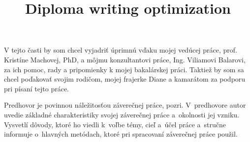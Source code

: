 \documentclass[]{tukediphc}
\title{Diploma writing optimization}
\begin{document}
\renewcommand{\figurename}{Obrázok}	
\renewcommand\theHfigure{\theHsection.\arabic{figure}}
\renewcommand\theHtable{\theHsection.\arabic{table}}


\prvastrana

\titulnastrana



%
%

\abstraktsk %

\abstrakteng %

\kabstrakt %

\zadanieprace

\cestnevyhlasenie

\podakovanie
V tejto časti by som chcel vyjadriť úprimnú vďaku mojej vedúcej práce, prof. Kristíne Machovej, PhD, a môjmu konzultantovi práce, Ing. Viliamovi Balarovi, za ich pomoc, rady a pripomienky k mojej bakalárskej práci. Taktiež by som sa chcel poďakovať svojim rodičom, mojej frajerke Diane a kamarátom za podporu pri písaní tejto práce.
\kpodakovania

\predhovor
Predhovor je povinnou náležitosťou záverečnej práce, pozri. V~predhovore autor uvedie základné charakteristiky
svojej záverečnej práce a~okolnosti jej vzniku. Vysvetlí dôvody, ktoré
ho viedli k~voľbe témy, cieľ a~účel práce a~stručne informuje
o~hlavných metódach, ktoré pri spracovaní záverečnej práce použil.
\kpredhovoru
\end{document}
